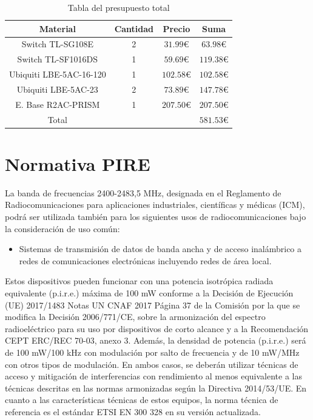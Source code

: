 \documentclass{article}
\begin{document}
\begin{table}[h]
    \centering
    \begin{tabular}{|c|c|c|c|}
        \hline
        Material & Cantidad & Precio & Suma\\
        \hline
        Switch TL-SG108E & 2 & $31.99\euro{}$ & $63.98\euro{}$\\
        Switch TL-SF1016DS & 1 & $59.69\euro{}$ & $119.38\euro{}$ \\
        Ubiquiti LBE-5AC-16-120  & 1 & $102.58\euro{}$ & $102.58\euro{}$\\
        Ubiquiti LBE-5AC-23& 2 & $73.89\euro{}$ & $147.78\euro{}$ \\
        E. Base R2AC-PRISM & 1 & $207.50\euro{}$ & $207.50\euro{}$ \\
        \hline
        Total &  &  & $581.53\euro{}$ \\

        \hline
    \end{tabular}
    \caption{Tabla del presupuesto total}
    \label{tab:presupuestos}
\end{table}
\newpage


\section{Normativa PIRE}

La banda de frecuencias 2400-2483,5 MHz, designada en el Reglamento de
Radiocomunicaciones para aplicaciones industriales, científicas y médicas (ICM),
podrá ser utilizada también para los siguientes usos de radiocomunicaciones bajo la
consideración de uso común:

\begin{itemize}

    \item Sistemas de transmisión de datos de banda ancha y de acceso inalámbrico
    a redes de comunicaciones electrónicas incluyendo redes de área local.

\end{itemize}

    Estos dispositivos pueden funcionar con una potencia isotrópica radiada equivalente
    (p.i.r.e.) máxima de 100 mW conforme a la Decisión de Ejecución (UE) 2017/1483
    Notas UN CNAF 2017 Página 37
    de la Comisión por la que se modifica la Decisión 2006/771/CE, sobre la
    armonización del espectro radioeléctrico para su uso por dispositivos de corto
    alcance y a la Recomendación CEPT ERC/REC 70-03, anexo 3.
    Además, la densidad de potencia (p.i.r.e.) será de 100 mW/100 kHz con modulación
    por salto de frecuencia y de 10 mW/MHz con otros tipos de modulación. En ambos
    casos, se deberán utilizar técnicas de acceso y mitigación de interferencias con
    rendimiento al menos equivalente a las técnicas descritas en las normas
    armonizadas según la Directiva 2014/53/UE.
    En cuanto a las características técnicas de estos equipos, la norma técnica de
    referencia es el estándar ETSI EN 300 328 en su versión actualizada.
\end{document}
